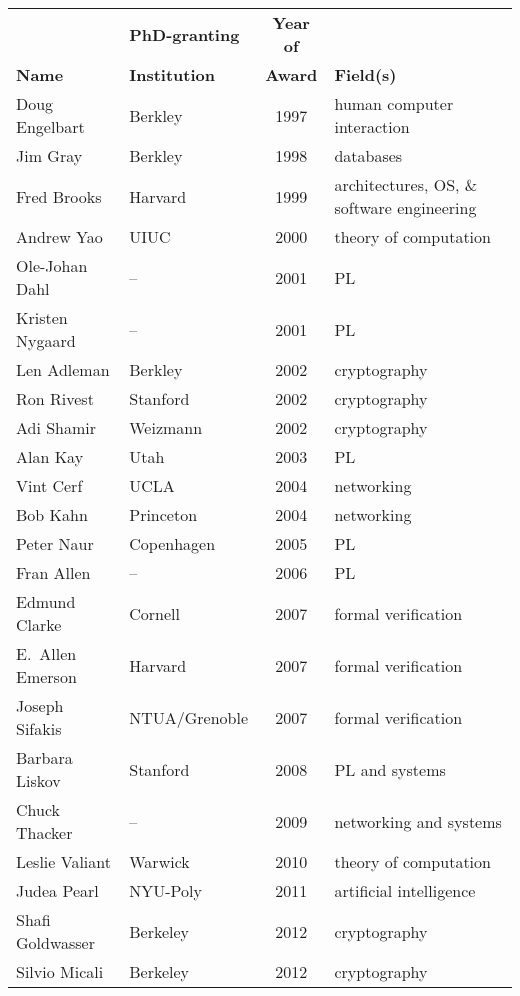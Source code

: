\documentclass[doublespacing]{utdthesis}
\begin{document}
\begin{table}[p]
  \contcaption
  \begin{center}
  \begin{tabular}{llcp{2.5in}} \hline
  & \textbf{PhD-granting} & \textbf{Year of} & \\
  \textbf{Name} & \textbf{Institution} & \textbf{Award} & \textbf{Field(s)} \\ \hline
  Doug Engelbart & Berkley & 1997 & human computer interaction \\
  Jim Gray & Berkley & 1998 & databases \\
  Fred Brooks & Harvard & 1999 & architectures, OS,
    \& software engineering \\
  Andrew Yao & UIUC & 2000 & theory of computation \\
  Ole-Johan Dahl & -- & 2001 & PL \\
  Kristen Nygaard & -- & 2001 & PL \\
  Len Adleman & Berkley & 2002 & cryptography \\
  Ron Rivest & Stanford & 2002 & cryptography \\
  Adi Shamir & Weizmann & 2002 & cryptography \\
  Alan Kay & Utah & 2003 & PL \\
  Vint Cerf & UCLA & 2004 & networking \\
  Bob Kahn & Princeton & 2004 & networking \\
  Peter Naur & Copenhagen & 2005 & PL \\
  Fran Allen & -- & 2006 & PL \\
  Edmund Clarke & Cornell & 2007 & formal verification \\
  E.~Allen Emerson & Harvard & 2007 & formal verification \\
  Joseph Sifakis & NTUA/Grenoble & 2007 & formal verification \\
  Barbara Liskov & Stanford & 2008 & PL and systems \\
  Chuck Thacker & -- & 2009 & networking and systems \\
  Leslie Valiant & Warwick & 2010 & theory of computation \\
  Judea Pearl & NYU-Poly & 2011 & artificial intelligence \\
  Shafi Goldwasser & Berkeley & 2012 & cryptography \\
  Silvio Micali & Berkeley & 2012 & cryptography \\

\end{tabular}
\end{center}
\end{table}
\end{document}
